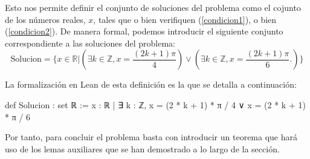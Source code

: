 Esto nos permite definir el conjunto de soluciones del problema
como el cojunto de los números reales, \(x\), tales que o bien
verifiquen (\ref{condicion1}), o bien (\ref{condicion2}). De
manera formal, podemos introducir el siguiente conjunto
correspondiente a las soluciones del problema:
\begin{equation}\label{ConjuntoSolucion}
  \text{Solucion}=\{x∈ ℝ | (∃k∈ℤ, x= \frac{(2k+1)π}{4})
  \lor (∃k∈ℤ, x=\frac{(2k+1)π}{6}.) \}
\end{equation}

La formalización en Lean de esta definición es la que se detalla
a continuación:
\begin{leancode}
  def Solucion : set ℝ :={ x : ℝ | ∃ k : ℤ,
    x = (2 * k + 1) * π / 4 ∨ x = (2 * k + 1) * π / 6 }
\end{leancode}

Por tanto, para concluir el problema basta con introducir un teorema
que hará uso de los lemas auxiliares que se han demostrado a lo
largo de la sección.

